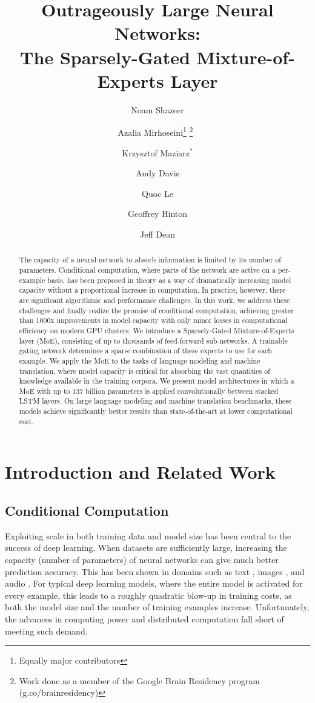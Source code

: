 \documentclass{article} %
\title{\Large Outrageously Large Neural Networks: \\
The Sparsely-Gated Mixture-of-Experts Layer}
\author[1]{Noam Shazeer}
\author[1]{Azalia Mirhoseini\thanks{Equally major contributors} \thanks{Work done as a member of the Google Brain Residency program (g.co/brainresidency)}~}
\author[2]{Krzysztof Maziarz$^*$}
\author[1]{Andy Davis}
\author[1]{Quoc Le}
\author[1]{Geoffrey Hinton}
\author[1]{Jeff Dean}
\affil[1]{Google Brain, \{noam,azalia,andydavis,qvl,geoffhinton,jeff\}@google.com}
\affil[2]{Jagiellonian University, Cracow, krzysztof.maziarz@student.uj.edu.pl}
\begin{document}
\maketitle

\begin{abstract}


The capacity of a neural network to absorb information is limited by its number of parameters.  Conditional computation, where parts of the network are active on a per-example basis, has been proposed in theory as a way of dramatically increasing model capacity without a proportional increase in computation.  In practice, however, there are significant algorithmic and performance challenges.  In this work, we address these challenges and finally realize the promise of conditional computation, achieving greater than 1000x improvements in model capacity with only minor losses in computational efficiency on modern GPU clusters.  We introduce a Sparsely-Gated Mixture-of-Experts layer (MoE), consisting of up to thousands of feed-forward sub-networks.  A trainable gating network determines a sparse combination of these experts to use for each example.  We apply the MoE to the tasks of language modeling and machine translation, where model capacity is critical for absorbing the vast quantities of knowledge available in the training corpora.  We present model architectures in which a MoE with up to 137 billion parameters is applied convolutionally between stacked LSTM layers.  On large language modeling and machine translation benchmarks, these models achieve significantly better results than state-of-the-art at lower computational cost.



\end{abstract}


\section{Introduction and Related Work}
\subsection{Conditional Computation}



Exploiting scale in both training data and model size has been central to the success of deep learning. When datasets are sufficiently large, increasing the capacity (number of parameters) of neural networks can give much better prediction accuracy.  This has been shown in domains such as text \citep{sutskever2014sequence,bahdanau2014neural,RafalNoam16,GNMT}, images \citep{Imagenet,qvl2012building}, and audio \citep{hinton2012deep,DeepSpeech2}.   For typical deep learning models, where the entire model is activated for every example, this leads to a roughly quadratic blow-up in training costs, as both the model size and the number of training examples increase.  Unfortunately, the advances in computing power and distributed computation fall short of meeting such demand. 
\end{document}

